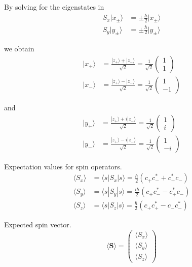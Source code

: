 By solving for the eigenstates in
\begin{align*}
S_x|x_\pm\rangle&=\pm\tfrac{\hbar}{2}|x_\pm\rangle
\\
S_y|y_\pm\rangle&=\pm\tfrac{\hbar}{2}|y_\pm\rangle
\end{align*}

we obtain
\begin{align*}
|x_+\rangle&=\frac{|z_+\rangle+|z_-\rangle}{\sqrt2}=\frac{1}{\sqrt2}\begin{pmatrix}1\\1\end{pmatrix}
\\
|x_-\rangle&=\frac{|z_+\rangle-|z_-\rangle}{\sqrt2}=\frac{1}{\sqrt2}\begin{pmatrix}1\\-1\end{pmatrix}
\end{align*}

and
\begin{align*}
|y_+\rangle&=\frac{|z_+\rangle+i|z_-\rangle}{\sqrt2}=\frac{1}{\sqrt2}\begin{pmatrix}1\\i\end{pmatrix}
\\
|y_-\rangle&=\frac{|z_+\rangle-i|z_-\rangle}{\sqrt2}=\frac{1}{\sqrt2}\begin{pmatrix}1\\-i\end{pmatrix}
\end{align*}

Expectation values for spin operators.
\begin{align*}
\langle S_x\rangle&=\langle s|S_x|s\rangle=\frac{\hbar}{2}\left(c_+c_-^*+c_+^*c_-\right)
\\
\langle S_y\rangle&=\langle s|S_y|s\rangle=\frac{i\hbar}{2}\left(c_+c_-^*-c_+^*c_-\right)
\\
\langle S_z\rangle&=\langle s|S_z|s\rangle=\frac{\hbar}{2}\left(c_+c_+^*-c_-c_-^*\right)
\end{align*}

Expected spin vector.
\begin{equation*}
\langle\mathbf S\rangle=\begin{pmatrix}
\langle S_x\rangle\\
\langle S_y\rangle\\
\langle S_z\rangle
\end{pmatrix}
\end{equation*}

